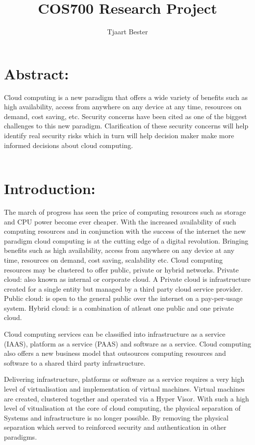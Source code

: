 \documentclass[11pt]{article}
\author{Tjaart Bester}
\begin{document}
\title{COS700 Research Project}
\maketitle

\section{Abstract:}
Cloud computing is a new paradigm that offers a wide variety of benefits such as high availability, access from anywhere on any device at any time, resources on demand, cost saving, etc. Security concerns have been cited as one of the biggest challenges to this new paradigm. Clarification of these security concerns will help identify real security risks which in turn will help decision maker make more informed decisions about cloud computing. \\ \\

\section{Introduction:}
The march of progress has seen the price of computing resources such as storage and CPU power become ever cheaper. With the increased availability of such computing resources and in conjunction with the success of the internet the new paradigm cloud computing is  at the cutting edge of a digital revolution. Bringing benefits such as high availability, access from anywhere on any device at any time, resources on demand, cost saving, scalability etc. Cloud computing resources may be clustered to offer public, private or hybrid networks. Private cloud: also known as internal or corporate cloud. A Private cloud is infrastructure created for a single entity but managed by a third party cloud service provider. Public cloud: is open to the general public over the internet on a pay-per-usage system. Hybrid cloud: is a combination of atleast one public and one private cloud.

Cloud computing services can be classified into infrastructure as a service (IAAS), platform as a service (PAAS) and software as a service. Cloud computing also offers a new business model that outsources computing resources and software to a shared third party infrastructure. 

Delivering infrastructure, platforms or software as a service requires a very high level of virtualisation and implementation of virtual machines. Virtual machines are created, clustered together and operated via a Hyper Visor. With such a high level of vitualisation at the core of cloud computing, the physical separation of Systems and infrastructure is no longer possible. By removing the physical separation which served to reinforced security and authentication in other paradigms. 
\end{document}
